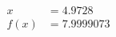\documentclass[preview]{standalone}
\begin{document}
\begin{align*}
x &= 4.9728\\f(x) &= 7.9999073
\end{align*}
\end{document}
